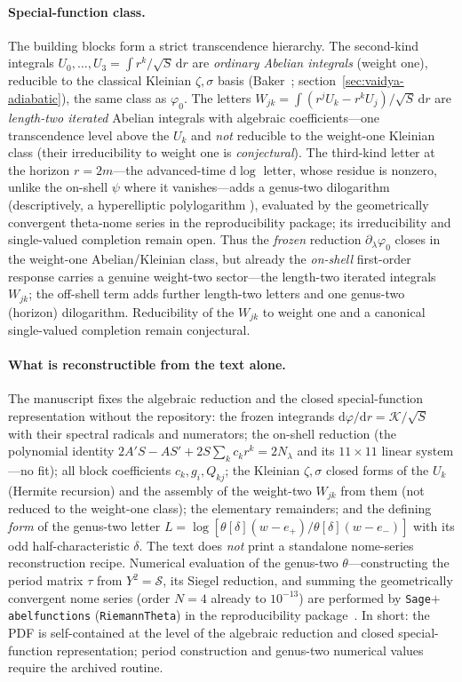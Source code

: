 \documentclass[12pt]{iopart}
\newcommand{\dd}{\mathrm{d}}
\begin{document}
\paragraph{Special-function class.} The building blocks form a strict transcendence
hierarchy. The second-kind integrals $U_0,\dots,U_3=\int r^k/\sqrt S\,\dd r$ are
\emph{ordinary Abelian integrals} (weight one), reducible to the classical Kleinian
$\zeta,\sigma$ basis (Baker~\cite{BakerAbelian1897}; section~\ref{sec:vaidya-adiabatic}),
the same class as $\varphi_0$. The letters
$W_{jk}=\int(r^jU_k-r^kU_j)/\sqrt S\,\dd r$ are \emph{length-two iterated} Abelian
integrals with algebraic coefficients---one transcendence level above the $U_k$ and
\emph{not} reducible to the weight-one Kleinian class (their irreducibility to weight one
is \emph{conjectural}). The third-kind letter at the horizon $r=2m$---the advanced-time
$\dd\log$ letter, whose residue is nonzero, unlike the on-shell $\psi$ where it
vanishes---adds a genus-two dilogarithm (descriptively, a hyperelliptic polylogarithm
\cite{BauneEtal2024,DHokerHiddingSchlotterer2025}), evaluated by the geometrically
convergent theta-nome series in the reproducibility package; its irreducibility and
single-valued completion remain open. Thus the \emph{frozen} reduction
$\partial_\lambda\varphi_0$ closes in the weight-one Abelian/Kleinian class, but already
the \emph{on-shell} first-order response carries a genuine weight-two sector---the
length-two iterated integrals $W_{jk}$; the off-shell term adds further length-two letters
and one genus-two (horizon) dilogarithm. Reducibility of the $W_{jk}$ to weight one and a
canonical single-valued completion remain conjectural.

\paragraph{What is reconstructible from the text alone.} The manuscript fixes the
algebraic reduction and the closed special-function representation without the
repository: the frozen integrands
$\dd\varphi/\dd r=\mathcal K/\sqrt S$ with their spectral radicals and numerators;
the on-shell reduction (the polynomial identity $2A'S-AS'+2S\sum_k c_kr^k=2N_\lambda$
and its $11\times11$ linear system---no fit); all block coefficients $c_k,g_i,Q_{kj}$;
the Kleinian $\zeta,\sigma$ closed forms of the $U_k$ (Hermite recursion) and the assembly
of the weight-two $W_{jk}$ from them (not reduced to the weight-one class); the elementary
remainders; and the defining \emph{form} of the genus-two letter
$L=\log[\theta[\delta](w-e_+)/\theta[\delta](w-e_-)]$ with its odd half-characteristic
$\delta$. The text does \emph{not} print a standalone nome-series reconstruction recipe.
Numerical evaluation of the genus-two $\theta$---constructing the period matrix
$\tau$ from $Y^2=\mathcal S$, its Siegel reduction, and summing the geometrically
convergent nome series (order $N{=}4$ already to $10^{-13}$) are performed by
\texttt{Sage}$+$\texttt{abelfunctions} (\texttt{RiemannTheta}) in the reproducibility
package~\cite{Rosignoli2026Code}. In short: the PDF is self-contained at the level of the
algebraic reduction and closed special-function representation; period construction and
genus-two numerical values require the archived routine.
\end{document}
